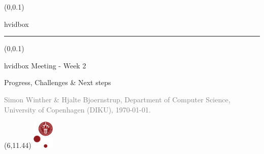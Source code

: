 \documentclass[t,24pt]{beamer}
\begin{document}
\setmainfont{Liberation Sans} %

{
\begin{frame}
    \begin{textblock*}{\textwidth}(0\textwidth,0.1\textheight)
        \begin{beamercolorbox}[wd=6.3cm,ht=7.7cm,sep=0.5cm]{hvidbox}
            \fontsize{4}{10}\selectfont {}
            \noindent\textcolor{KUrod}{\rule{5.3cm}{0.4pt}}
        \end{beamercolorbox}
    \end{textblock*}
    \begin{textblock*}{\textwidth}(0\textwidth,0.1\textheight)
        \begin{beamercolorbox}[wd=6.3cm,sep=0.5cm]{hvidbox}
                \Large \textcolor{KUrod}{Meeting - Week 2}
                \vspace{0.5cm}
                \par
                \large Progress, Challenges \& Next steps
                \vspace{0.5cm}
                \par
                \textcolor{gray}{\scriptsize Simon Winther \& Hjalte Bjoernstrup, Department of Computer Science, University of Copenhagen (DIKU), \today.}
        \end{beamercolorbox}
    \end{textblock*}
    \begin{textblock}{1}(6,11.44)
        \includegraphics[width=1cm]{KU/KU-logo.png}
    \end{textblock}
\end{frame}
}
\end{document}
